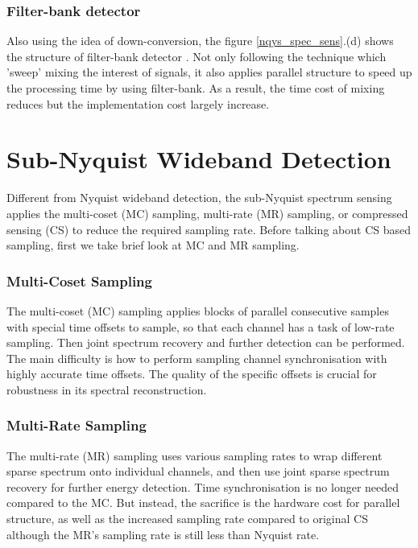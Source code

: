 \subsubsection{Filter-bank detector}
Also using the idea of down-conversion, the figure \ref{nqys_spec_sens}.(d) shows the structure of filter-bank detector \cite{farhang2008filter}. Not only following the technique which 'sweep' mixing the interest of signals, it also applies parallel structure to speed up the processing time by using filter-bank. As a result, the time cost of mixing reduces but the implementation cost largely increase.

\section{Sub-Nyquist Wideband Detection}

Different from Nyquist wideband detection, the sub-Nyquist spectrum sensing applies the multi-coset (MC) sampling, multi-rate (MR) sampling, or compressed sensing (CS) to reduce the required sampling rate. Before talking about CS based sampling, first we take brief look at MC and MR sampling.

\subsubsection{Multi-Coset Sampling}

The multi-coset (MC) sampling \cite{venkataramani2000perfect} applies blocks of parallel consecutive samples with special time offsets to sample, so that each channel has a task of low-rate sampling. Then joint spectrum recovery and further detection can be performed. The main difficulty is how to perform sampling channel synchronisation with highly accurate time offsets. The quality of the specific offsets is crucial for robustness in its spectral reconstruction.

\subsubsection{Multi-Rate Sampling}

The multi-rate (MR) sampling \cite{sun2013wideband} uses various sampling rates to wrap different sparse spectrum onto individual channels, and then use joint sparse spectrum recovery for further energy detection. Time synchronisation is no longer needed compared to the MC. But instead, the sacrifice is the hardware cost for parallel structure, as well as the increased sampling rate compared to original CS although the MR's sampling rate is still less than Nyquist rate. 

